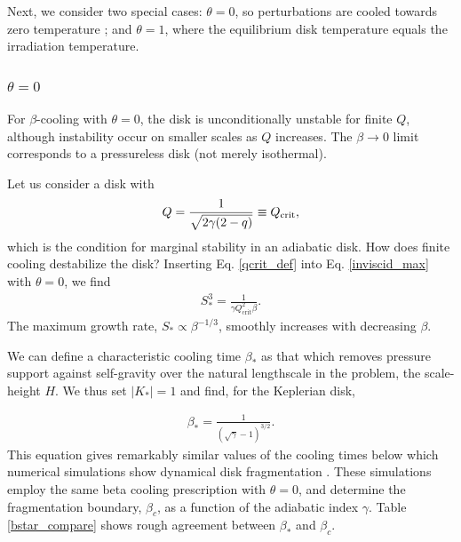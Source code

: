 
Next, we consider two special cases: $\theta=0$, so perturbations are
cooled towards zero temperature \citep[typically employed in
numerical simulations, e.g.][]{gammie01}; and $\theta=1$, where the
equilibrium disk temperature equals the irradiation temperature.  

\subsubsection{$\theta = 0$}\label{theta0}
For $\beta$-cooling with $\theta=0$, the disk is unconditionally
unstable for finite $Q$, although instability occur on smaller scales
as $Q$ increases.  The $\beta\to0$ limit corresponds to a 
pressureless disk (not merely isothermal).   

Let us consider a disk with 
\begin{align}\label{qcrit_def}
  Q = \frac{1}{\sqrt{2\gamma(2-q)}}\equiv Q_{\mathrm{crit}},
\end{align} 
which is the condition for marginal stability in an adiabatic disk. 
How does finite cooling destabilize the disk?  
Inserting Eq. \ref{qcrit_def} into Eq. \ref{inviscid_max} with 
$\theta=0$, we find 
\begin{align}\label{sstar}
  S_*^3 = \frac{1}{\gamma Q_\mathrm{crit}^2 \beta}. 
\end{align}
The maximum growth rate, $S_*\propto \beta^{-1/3}$, smoothly
increases with decreasing $\beta$. 

We can define a characteristic cooling
time $\beta_*$ as that which removes pressure support against
self-gravity over the natural lengthscale in the problem, the
scale-height $H$. We thus set $|K_*|=1$ and find, for the Keplerian
disk,  

\begin{align}\label{betastar}
  \beta_* = \frac{1}{\left(\sqrt{\gamma} - 1\right)^{3/2}}. 
\end{align}
This equation gives remarkably similar values 
of the cooling times below which 
numerical simulations show dynamical disk fragmentation 
\citep{gammie01,rice05,rice11}. These simulations employ the same beta  
cooling prescription with $\theta=0$, and determine the fragmentation
boundary, $\beta_c$, as a function of the adiabatic index $\gamma$.  
Table \ref{bstar_compare} shows rough agreement between $\beta_*$ and 
$\beta_c$.  

